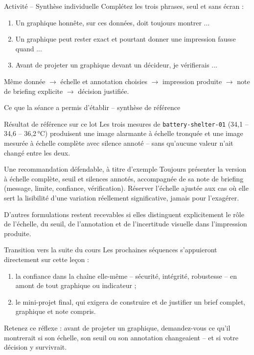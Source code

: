 \documentclass[aspectratio=169]{beamer}
\begin{document}
\begin{frame}{Activité -- Synthèse individuelle}
  Complétez les trois phrases, seul et sans écran :
  \begin{enumerate}
    \item Un graphique honnête, sur ces données, doit toujours montrer ...
    \item Un graphique peut rester exact et pourtant donner une impression fausse quand ...
    \item Avant de projeter un graphique devant un décideur, je vérifierais ...
  \end{enumerate}
  \vfill
  \alert{Même donnée $\rightarrow$ échelle et annotation choisies $\rightarrow$ impression produite $\rightarrow$ note de briefing explicite $\rightarrow$ décision justifiée.}
\end{frame}

\begin{frame}{Ce que la séance a permis d'établir -- synthèse de référence}
  \small
  \begin{block}{Résultat de référence sur ce lot}
    Les trois mesures de \texttt{battery-shelter-01} (34,1 -- 34,6 -- 36,2\,°C) produisent une image alarmante à échelle tronquée et une image mesurée à échelle complète avec silence annoté -- sans qu'aucune valeur n'ait changé entre les deux.
  \end{block}
  \begin{block}{Une recommandation défendable, à titre d'exemple}
    Toujours présenter la version à échelle complète, seuil et silences annotés, accompagnée de sa note de briefing (message, limite, confiance, vérification). Réserver l'échelle ajustée aux cas où elle sert la lisibilité d'une variation réellement significative, jamais pour l'exagérer.
  \end{block}
  \normalsize
  \alert{D'autres formulations restent recevables si elles distinguent explicitement le rôle de l'échelle, du seuil, de l'annotation et de l'incertitude visuelle dans l'impression produite.}
\end{frame}

\begin{frame}{Transition vers la suite du cours}
  Les prochaines séquences s'appuieront directement sur cette leçon :
  \begin{enumerate}
    \item la confiance dans la chaîne elle-même -- sécurité, intégrité, robustesse -- en amont de tout graphique ou indicateur ;
    \item le mini-projet final, qui exigera de construire et de justifier un brief complet, graphique et note compris.
  \end{enumerate}
  \vfill
  Retenez ce réflexe : avant de projeter un graphique, demandez-vous ce qu'il montrerait si son échelle, son seuil ou son annotation changeaient -- et si votre décision y survivrait.
\end{frame}
\end{document}
